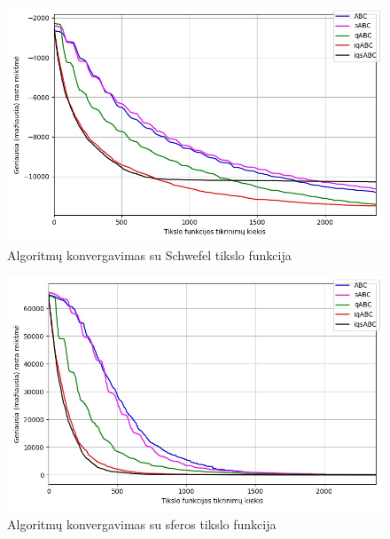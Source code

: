 \documentclass{VUMIFKompMagistrinis}
\begin{document}
\begin{landscape}
\begin{multicols}{2}
\begin{figure}[H]
    \centering
    \includegraphics[scale=0.45]{img/2kv/all_schwefel.jpg}
     \caption{Algoritmų konvergavimas su Schwefel tikslo funkcija}
    \label{img:kon7}
\end{figure}

\begin{figure}[H]
    \centering
    \includegraphics[scale=0.45]{img/2kv/all_Sphere.jpg}
     \caption{Algoritmų konvergavimas su sferos tikslo funkcija}
    \label{img:kon8}
\end{figure}





\end{multicols}
\begin{multicols}{2}


\end{multicols}
\end{landscape}
\end{document}
